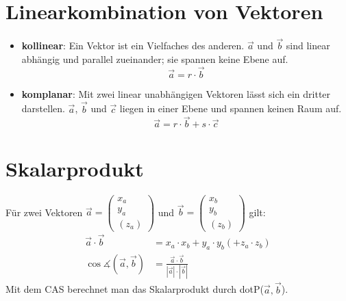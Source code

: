 \section{Linearkombination von Vektoren}
\begin{itemize}
  \item \textbf{kollinear}: Ein Vektor ist ein Vielfaches des anderen. $\overrightarrow{a}$ und $\overrightarrow{b}$ sind linear abhängig und parallel zueinander; sie spannen keine Ebene auf.
  \begin{equation}
    \overrightarrow{a}=r\cdot\overrightarrow{b}
  \end{equation}

  \item \textbf{komplanar}: Mit zwei linear unabhängigen Vektoren lässt sich ein dritter darstellen. $\overrightarrow{a}$, $\overrightarrow{b}$ und $\overrightarrow{c}$ liegen in einer Ebene und spannen keinen Raum auf.
  \begin{equation}
    \overrightarrow{a}=r\cdot\overrightarrow{b}+s\cdot\overrightarrow{c}
  \end{equation}
\end{itemize}

\newpage
\section{Skalarprodukt}
Für zwei Vektoren $\overrightarrow{a}=\left(\begin{array}{c}x_a\\ y_a\\(z_a)\end{array}\right)$ und $\overrightarrow{b}=\left(\begin{array}{c}x_b\\ y_b\\(z_b)\end{array}\right)$ gilt:
\begin{align}
  \overrightarrow{a}\cdot\overrightarrow{b}
  &= x_a \cdot x_b + y_a \cdot y_b (+z_a \cdot z_b) \\
  \cos\measuredangle(\overrightarrow{a},\overrightarrow{b})
  &= \frac{\overrightarrow{a}\cdot\overrightarrow{b}}{|\overrightarrow{a}|\cdot|\overrightarrow{b}|}
\end{align}
Mit dem CAS berechnet man das Skalarprodukt durch \glqq dotP($\overrightarrow{a},\overrightarrow{b}$)\grqq.


